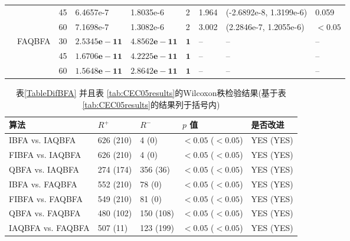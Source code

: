 \begin{longtable}[!tb]{p{0.3cm}p{1.2cm}p{0.3cm}p{2.45cm}p{2.45cm}p{0.5cm}p{1.2cm}p{4.5cm}p{1.5cm}}
             & &45 &6.4657e-7 & 1.8035e-6 &2 &1.964 &(-2.6892e-8, 1.3199e-6) &0.059  \\
             & &60 &7.1698e-7 & 1.3082e-6  &2 &3.002 &(2.2846e-7, 1.2055e-6) &$<0.05$ \\
 &FAQBFA &30 &$\bm{2.5345e-11}$  &$\bm{4.8562e-11}$  & $\bm{1}$&-- &-- &--  \\
             & &45 &$\bm{1.6706e-11}$ &$\bm{4.2225e-11}$   &$\bm{1}$ &-- &-- &--  \\
             & &60 &$\bm{1.5648e-11}$ &$\bm{2.8642e-11}$  & $\bm{1}$&-- &-- &--
\end{longtable}
\begin{table}[!htb]
\begin{center}
\caption{表\ref{TableDifBFA} 并且表 \ref{tab:CEC05results}的Wilcoxon秩检验结果(基于表\ref{tab:CEC05results}的结果列于括号内)}
\vspace{0.5em}\centering
\begin{tabularx}{\textwidth}{p{3.9cm}p{1.8cm}p{1.8cm}p{2.8cm}p{3.9cm}}
\hline
算法&   $R^{+}$   	&   $R^{-}$   &   $p$ 值 &是否改进\\
\midrule
IBFA vs. IAQBFA & 626 (210)   & 4 (0)   & $<0.05$ ($<0.05$)  &YES (YES)\\
FIBFA vs. IAQBFA &626 (210)     & 4  (0)  & $<0.05$ ($<0.05$) &YES (YES) \\
QBFA vs. IAQBFA & 274 (174)   & 356  (36)  &$<0.05$  ($<0.05$)  &YES (YES)\\
IBFA vs. FAQBFA &552 (210)     & 78  (0)  &$<0.05$ ($<0.05$)  &YES (YES)\\
FIBFA vs. FAQBFA &549  (210)    & 81  (0)  &$<0.05$  ($<0.05$) &YES (YES)\\
QBFA vs. FAQBFA & 480 (102)    & 150 (108)   &$<0.05$ ($<0.05$)  &YES  (YES)\\
IAQBFA vs. FAQBFA &507 (11)     &123 (199)   &$<0.05$ ($<0.05$)  &YES (YES)\\
\hline
\end{tabularx}
\label{Friedman_test}
\end{center}
\end{table}
